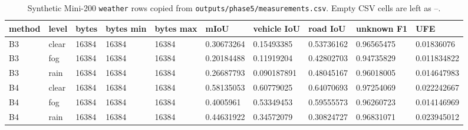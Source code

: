 \begin{table}[t]
\centering
\caption{Synthetic Mini-200 \texttt{weather} rows copied from \texttt{outputs/phase5/measurements.csv}. Empty CSV cells are left as --.}
\label{tab:weather}
\scriptsize
\setlength{\tabcolsep}{3pt}
\begin{tabular}{llllllllll}
\toprule
method & level & bytes & bytes min & bytes max & mIoU & vehicle IoU & road IoU & unknown F1 & UFE \\
\midrule
B3 & clear & 16384 & 16384 & 16384 & 0.30673264 & 0.15493385 & 0.53736162 & 0.96565475 & 0.01836076 \\
B3 & fog & 16384 & 16384 & 16384 & 0.20184488 & 0.11919204 & 0.42802703 & 0.94735829 & 0.011834822 \\
B3 & rain & 16384 & 16384 & 16384 & 0.26687793 & 0.090187891 & 0.48045167 & 0.96018005 & 0.014647983 \\
B4 & clear & 16384 & 16384 & 16384 & 0.58135053 & 0.60779025 & 0.64070693 & 0.97254069 & 0.022242667 \\
B4 & fog & 16384 & 16384 & 16384 & 0.4005961 & 0.53349453 & 0.59555573 & 0.96260723 & 0.014146969 \\
B4 & rain & 16384 & 16384 & 16384 & 0.44631922 & 0.34572079 & 0.30824727 & 0.96831071 & 0.023945012 \\
\bottomrule
\end{tabular}
\end{table}
